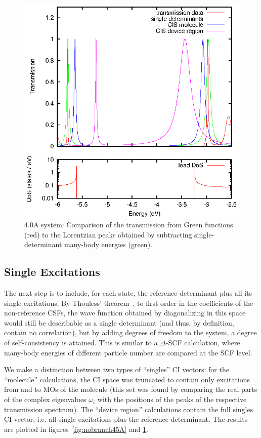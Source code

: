 \begin{figure}[h]
	\begin{center}
		\includegraphics[width=0.9\linewidth]{figures/nobrsingles40A.eps}
	\end{center}
	\caption{4.0A system: Comparison of the transmission from Green
                 functions (red) to the Lorentzian peaks obtained by
                 subtracting single-determinant many-body energies (green).}
	\label{fig:nobranch40A}
\end{figure}

\subsection{Single Excitations}
\label{subsec:singles}

The next step is to include, for each state, the reference determinant plus all
its single excitations. By Thouless' theorem~\cite{Thouless}, to first order in
the coefficients of the non-reference \acp{CSF}, the wave function obtained by
diagonalizing in this space would still be describable as a single determinant
(and thus, by definition, contain no correlation), but by adding degrees of
freedom to the system, a degree of self-consistency is attained. This is similar
to a $\Delta$-SCF calculation, where many-body energies of different particle
number are compared at the SCF level.

We make a distinction between two types of ``singles'' \ac{CI} vectors: for the
``molecule'' calculations, the \ac{CI} space was truncated to contain only
excitations from and to MOs of the molecule (this set was found by comparing
the real parts of the complex eigenvalues $\omega_i$ with the positions of the
peaks of the respective transmission spectrum). The ``device region''
calculations contain the full singles \ac{CI} vector, i.e. all single
excitations plus the reference determinant. The results are plotted in
figures~\ref{fig:nobranch45A} and \ref{fig:nobranch40A}.

